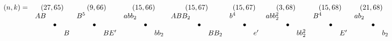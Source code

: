 \documentclass{article}
\begin{document}
\(
\begin{array}{crclrclrclrclrclrclrclrcl}
  (n,k)= & \multicolumn{3}{c}{(27,65)} & \multicolumn{3}{c}{(9,66)} & \multicolumn{3}{c}{(15,66)} & \multicolumn{3}{c}{(15,67)} & \multicolumn{3}{c}{(15,67)} & \multicolumn{3}{c}{(3,68)} & \multicolumn{3}{c}{(15,68)} & \multicolumn{3}{c}{(21,68)} \\
  & AB & & & B^5 & & & abb_2 & & & ABB_2 & & & b^4 & & & abb_2^2 & & & B^4 & & & ab_2 & & \\
  & & \bullet & & & \bullet & & & \bullet & & & \bullet & & & \bullet & & & \bullet & & & \bullet & & & \bullet & \\
  & & & B & & & BE' & & & bb_2 & & & BB_2 & & & e' & & & bb_2^2 & & & E' & & & b_2 
\end{array}
\)\\
\end{document}
